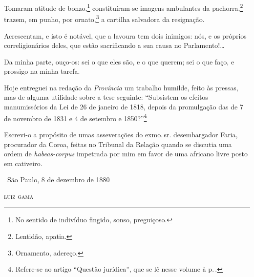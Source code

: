 Tomaram atitude de bonzo,\footnote{No sentido de indivíduo fingido,
  sonso, preguiçoso.} constituíram-se imagens ambulantes da
pachorra,\footnote{Lentidão, apatia.} trazem, em punho, por
ornato,\footnote{Ornamento, adereço.} a cartilha salvadora da
resignação.


Acrescentam, e isto é notável, que a lavoura tem dois inimigos: nós, e
os próprios correligionários deles, que estão sacrificando a sua causa
no Parlamento!\ldots{}

Da minha parte, ouço-os: sei o que eles são, e o que querem; sei o que
faço, e prossigo na minha tarefa.

Hoje entreguei na redação da \emph{Província} um trabalho humilde, feito
às pressas, mas de alguma utilidade sobre a tese seguinte: ``Subsistem os
efeitos manumissórios da Lei de 26 de janeiro de 1818, depois da
promulgação das de 7 de novembro de 1831 e 4 de setembro e
1850?''\footnote{Refere-se ao artigo ``Questão jurídica'', que se lê
  nesse volume à p.\,\pageref{questao}.}

Escrevi-o a propósito de
umas asseverações do exmo.\,sr. desembargador Faria, procurador da Coroa,
feitas no Tribunal da Relação quando se discutia uma ordem de
\emph{habeas-corpus} impetrada por mim em favor de uma africano livre
posto em cativeiro.

\medskip

\hfill\ São Paulo, 8 de dezembro de 1880

\hfill\textsc{luiz gama}


